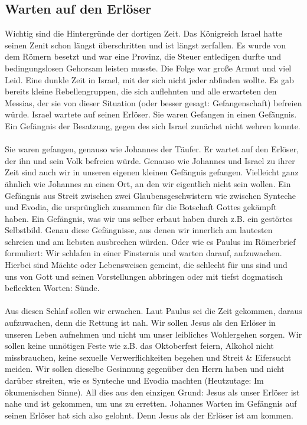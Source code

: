 \subsection{Warten auf den Erlöser}
Wichtig sind die Hintergründe der dortigen Zeit. Das Königreich Israel hatte seinen Zenit schon längst überschritten und ist längst zerfallen. Es wurde von dem Römern besetzt und war eine Provinz, die Steuer entledigen durfte und bedingungslosen Gehorsam leisten musste. Die Folge war große Armut und viel Leid. Eine dunkle Zeit in Israel, mit der sich nicht jeder abfinden wollte. Es gab bereits kleine Rebellengruppen, die sich auflehnten und alle erwarteten den Messias, der sie von dieser Situation (oder besser gesagt: Gefangenschaft) befreien würde. Israel wartete auf seinen Erlöser. Sie waren Gefangen in einen Gefängnis. Ein Gefängnis der Besatzung, gegen des sich Israel zunächst nicht wehren konnte.  
\\~\\
Sie waren gefangen, genauso wie Johannes der Täufer. Er wartet auf den Erlöser, der ihn und sein Volk befreien würde. Genauso wie Johannes und Israel zu ihrer Zeit sind auch wir in unseren eigenen kleinen Gefängnis gefangen. Vielleicht ganz ähnlich wie Johannes an einen Ort, an den wir eigentlich nicht sein wollen. Ein Gefängnis aus Streit zwischen zwei Glaubensgeschwistern wie zwischen Synteche und Evodia, die ursprünglich zusammen für die Botschaft Gottes gekämpft haben. Ein Gefängnis, was wir uns selber erbaut haben durch z.B. ein gestörtes Selbstbild. Genau diese Gefängnisse, aus denen wir innerlich am lautesten schreien und am liebsten ausbrechen würden. Oder wie es Paulus im Römerbrief formuliert: Wir schlafen in einer Finsternis und warten darauf, aufzuwachen. Hierbei sind Mächte oder Lebensweisen gemeint, die schlecht für uns sind und uns von Gott und seinen Vorstellungen abbringen oder mit tiefst dogmatisch befleckten Worten: Sünde.
\\~\\
Aus diesen Schlaf sollen wir erwachen. Laut Paulus sei die Zeit gekommen, daraus aufzuwachen, denn die Rettung ist nah. Wir sollen Jesus als den Erlöser in unseren Leben aufnehmen und nicht um unser leibliches Wohlergehen sorgen. Wir sollen keine unnötigen Feste wie z.B. das Oktoberfest feiern, Alkohol nicht missbrauchen, keine sexuelle Verwerflichkeiten begehen und Streit \& Eifersucht meiden. Wir sollen dieselbe Gesinnung gegenüber den Herrn haben und nicht darüber streiten, wie es Synteche und Evodia machten (Heutzutage: Im ökumenischen Sinne). All dies aus den einzigen Grund: Jesus als unser Erlöser ist nahe und ist gekommen, um uns zu erretten. Johannes Warten im Gefängnis auf seinen Erlöser hat sich also gelohnt. Denn Jesus als der Erlöser ist am kommen.
